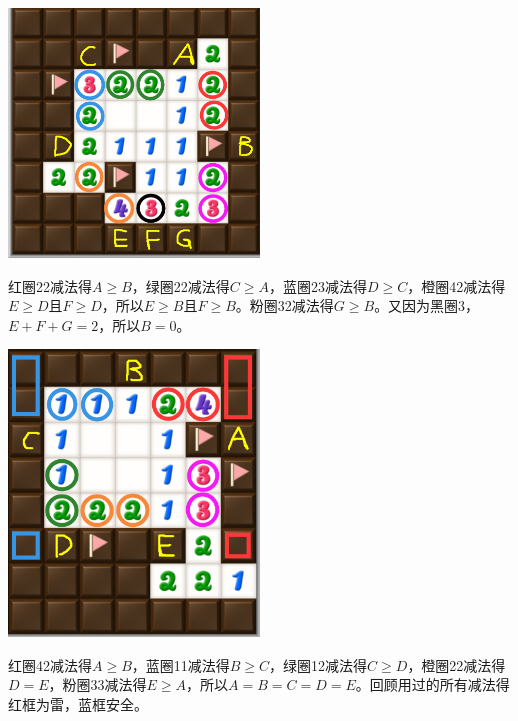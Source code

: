 \vspace{5mm}
\begin{center}
    \includegraphics[width=0.5\textwidth]{trick/环6.png}
\end{center}
红圈22减法得$A\ge B$，绿圈22减法得$C\ge A$，蓝圈23减法得$D\ge C$，橙圈42减法得$E\ge D$且$F\ge D$，所以$E\ge B$且$F\ge B$。粉圈32减法得$G\ge B$。又因为黑圈3，$E+F+G=2$，所以$B=0$。

\vspace{5mm}
\begin{center}
    \includegraphics[width=0.5\textwidth]{trick/环7.png}
\end{center}
红圈42减法得$A\ge B$，蓝圈11减法得$B\ge C$，绿圈12减法得$C\ge D$，橙圈22减法得$D=E$，粉圈33减法得$E\ge A$，所以$A=B=C=D=E$。回顾用过的所有减法得红框为雷，蓝框安全。